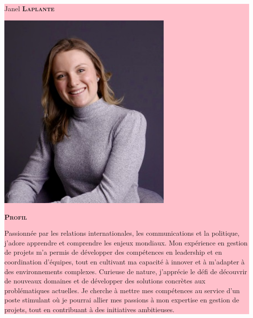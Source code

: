 \documentclass[11pt, a4paper]{article}
\newcommand{\headleft}[1]{\vspace*{3ex}\textsc{\textbf{#1}}\par%
    \vspace*{-1.5ex}\hrulefill\par\vspace*{0.7ex}}
\begin{document}
\setlength{\topskip}{0pt}
\setlength{\parindent}{0pt}
\setlength{\parskip}{0pt}
\setlength{\fboxsep}{0pt}
\pagestyle{empty}
\raggedbottom

\begin{minipage}[t]{0.33\textwidth} %
\colorbox{pink}{\begin{minipage}[t][5mm][t]{\textwidth}\null\hfill\null\end{minipage}}

\vspace{-.2ex} %
\colorbox{pink}{\color{white}  %
\textwidth\relax%
\begin{minipage}[t][293mm][t]{0.82\textwidth}
\raggedright
\vspace*{2.5ex}

\Large Janel \textbf{\textsc{Laplante}} \normalsize 

\null\hfill\includegraphics[width=0.65\textwidth]{portrait}\hfill\null

\vspace*{0.5ex} %

\headleft{Profil}
Passionnée par les relations internationales, les communications et la politique, j'adore apprendre et comprendre les enjeux mondiaux. Mon expérience en gestion de projets m'a permis de développer des compétences en leadership et en coordination d'équipes, tout en cultivant ma capacité à innover et à m’adapter à des environnements complexes. Curieuse de nature, j'apprécie le défi de découvrir de nouveaux domaines et de développer des solutions concrètes aux problématiques actuelles. Je cherche à mettre mes compétences au service d’un poste stimulant où je pourrai allier mes passions à mon expertise en gestion de projets, tout en contribuant à des initiatives ambitieuses.


\end{minipage}}
\end{minipage}
\end{document}
